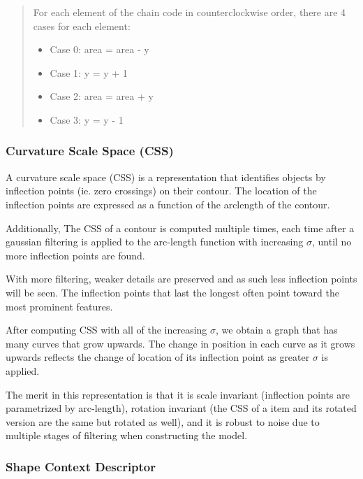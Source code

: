 \documentclass{article}
\begin{document}
\begin{multicols}{2}
\begin{quote}

For each element of the chain code in counterclockwise order, there are 4 cases for each element:

\begin{itemize}
  \item Case 0: area = area - y
  \item Case 1: y = y + 1
  \item Case 2: area = area + y
  \item Case 3: y = y - 1
\end{itemize}

\end{quote}

\subsubsection{Curvature Scale Space (CSS)}

A curvature scale space (CSS) is a representation that identifies objects by inflection points (ie. zero crossings) on their contour. The location of the inflection points are expressed as a function of the arclength of the contour. 

Additionally, The CSS of a contour is computed multiple times, each time after a gaussian filtering is applied to the arc-length function with increasing $\sigma$, until no more inflection points are found. 

With more filtering, weaker details are preserved and as such less inflection points will be seen. The inflection points that last the longest often point toward the most prominent features.

After computing CSS with all of the increasing $\sigma$, we obtain a graph that has many curves that grow upwards. The change in position in each curve as it grows upwards reflects the change of location of its inflection point as greater $\sigma$ is applied.

The merit in this representation is that it is scale invariant (inflection points are parametrized by arc-length), rotation invariant (the CSS of a item and its rotated version are the same but rotated as well), and it is robust to noise due to multiple stages of filtering when constructing the model.

\subsubsection{Shape Context Descriptor}


\end{multicols}
\end{document}
